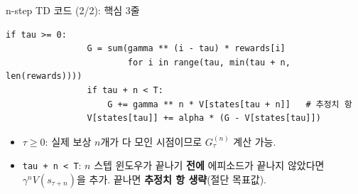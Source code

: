 \begin{frame}[fragile]{n-step TD 코드 (2/2): 핵심 3줄}
  \begin{lstlisting}[basicstyle=\ttfamily\footnotesize]
            if tau >= 0:
                G = sum(gamma ** (i - tau) * rewards[i]
                        for i in range(tau, min(tau + n, len(rewards))))
                if tau + n < T:
                    G += gamma ** n * V[states[tau + n]]   # 추정치 항
                V[states[tau]] += alpha * (G - V[states[tau]])
  \end{lstlisting}
  \begin{itemize}
    \item $\tau \ge 0$: 실제 보상 $n$개가 다 모인 시점이므로 $G_\tau^{(n)}$
      계산 가능.
    \item \texttt{tau + n < T}: $n$ 스텝 윈도우가 끝나기 \textbf{전에}
      에피소드가 끝나지 않았다면 $\gamma^n V(s_{\tau+n})$을 추가.
      끝나면 \textbf{추정치 항 생략}(절단 목표값).
    
  \end{itemize}

\end{frame}
